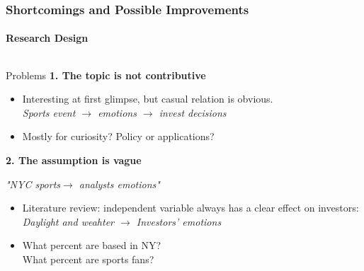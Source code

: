 \documentclass[]{beamer}
\begin{document}
\begin{frame}
        \frametitle{Shortcomings and Possible Improvements }
        \framesubtitle{Research Design}

        \begin{columns}
        \begin{block}{\small{Problems}}
            \small \textbf{\alert{1.} The topic is not contributive }\\\vskip 0.01cm
                \scriptsize
                \begin{itemize}
                \item Interesting at first glimpse, but casual relation is obvious.\\
                \tiny{\textit{Sports event $\rightarrow$ emotions $\rightarrow$ invest decisions}} 
                    \scriptsize
               \item Mostly for curiosity? Policy  or applications? 
                \end{itemize}
            
            \small \textbf{\alert{2.} The assumption is vague}\\
                \tiny
                \begin{itemize}
                \textit{"NYC sports$\rightarrow$ analysts emotions"}
                \end{itemize}
                  \vskip -0.25cm  
                \begin{itemize}
                \scriptsize 
                \item Literature review: independent variable always has a clear effect on investors:\\\vskip 0.15cm 
                \tiny{\textit{Daylight and weahter $\rightarrow$ Investors' emotions \citep{p5}\citep{p6}}}
                \vskip -0.15cm
            \scriptsize
                  \item What percent are based in NY?\\
                        What percent are sports fans? 

                \end{itemize}
                
        \end{block}

 
    
      \vskip 0.7cm
      \big\Rightarrow
           

\end{columns}
\end{frame}
\end{document}
